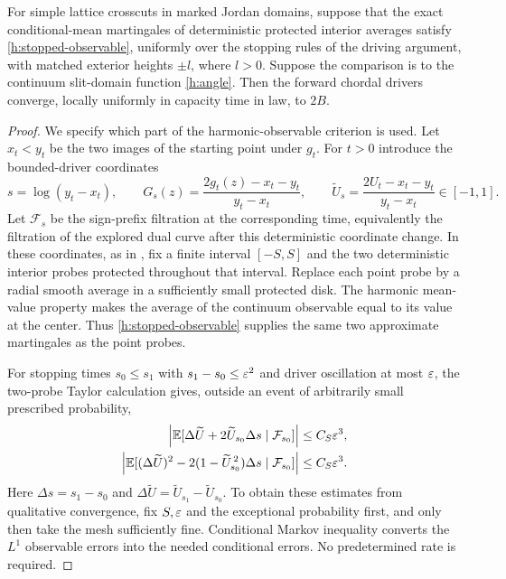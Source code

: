 \begin{lemma}
\label{h:driving}
For simple lattice crosscuts in marked Jordan domains, suppose that
the exact conditional-mean martingales of deterministic protected
interior averages satisfy \eqref{h:stopped-observable}, uniformly over
the stopping rules of the driving argument, with matched exterior
heights $\pm l$, where $l>0$. Suppose the comparison is to the continuum
slit-domain function \eqref{h:angle}. Then the forward chordal drivers
converge, locally uniformly in capacity time in law, to $2B$.
\end{lemma}
\begin{proof}
We specify which part of the harmonic-observable criterion is used.
Let $x_t<y_t$ be the two images of the starting point under $g_t$.
For $t>0$ introduce the bounded-driver coordinates
\[
 s=\log(y_t-x_t),\qquad
 G_s(z)=\frac{2g_t(z)-x_t-y_t}{y_t-x_t},\qquad
 \widetilde U_s=\frac{2U_t-x_t-y_t}{y_t-x_t}\in[-1,1].
\]
Let $\mathcal F_s$ be the sign-prefix filtration at the corresponding
time, equivalently the filtration of the explored dual curve after
this deterministic coordinate change. In these coordinates, as in
\cite[Sections 4.2--4.5]{SSdiscrete},
fix a finite interval $[-S,S]$ and the two deterministic interior
probes protected throughout that interval. Replace each point probe by
a radial smooth average in a sufficiently small protected disk.
The harmonic mean-value property makes the average of the continuum
observable equal to its value at the center. Thus
\eqref{h:stopped-observable} supplies the same two approximate
martingales as the point probes.

For stopping times $s_0\le s_1$ with
$s_1-s_0\le\varepsilon^2$ and driver oscillation at most $\varepsilon$, the two-probe
Taylor calculation gives, outside an event of arbitrarily small
prescribed probability,
\begin{align}
 \left|\mathbb E[\Delta\widetilde U+
       2\widetilde U_{s_0}\Delta s\mid\mathcal F_{s_0}]\right|
       &\le C_S\varepsilon^3, \label{h:driver-first}\\
 \left|\mathbb E[(\Delta\widetilde U)^2-
       2(1-\widetilde U_{s_0}^{\,2})\Delta s
           \mid\mathcal F_{s_0}]\right|
       &\le C_S\varepsilon^3. \label{h:driver-second}
\end{align}
Here $\Delta s=s_1-s_0$ and
$\Delta\widetilde U=\widetilde U_{s_1}-\widetilde U_{s_0}$.
To obtain these estimates from qualitative convergence, fix
$S,\varepsilon$ and the exceptional probability first, and only then take
the mesh sufficiently fine. Conditional Markov inequality converts
the $L^1$ observable errors into the needed conditional errors.
No predetermined rate is required.


\end{proof}
